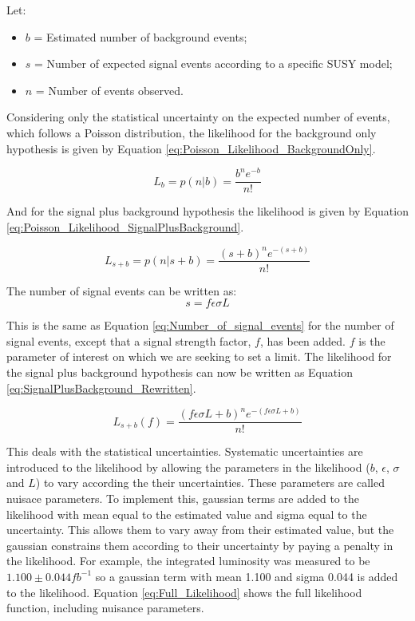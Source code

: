 Let: 
\begin{itemize}
\item $b$ = Estimated number of background events;
\item $s$ = Number of expected signal events according to a specific SUSY model;
\item $n$ = Number of events observed.
\end{itemize}

Considering only the statistical uncertainty on the expected number of events, 
which follows a Poisson distribution, the likelihood for the background only 
hypothesis is given by Equation \ref{eq:Poisson_Likelihood_BackgroundOnly}.

\begin{equation}
L_{b} = p(n|b) = \frac{b^{n}e^{-b}}{n!} 
\label{eq:Poisson_Likelihood_BackgroundOnly}
\end{equation}

And for the signal plus background hypothesis the likelihood is given by Equation
\ref{eq:Poisson_Likelihood_SignalPlusBackground}.

\begin{equation}
L_{s+b} = p(n|s+b) = \frac{(s+b)^{n}e^{-(s+b)}}{n!} 
\label{eq:Poisson_Likelihood_SignalPlusBackground}
\end{equation}

The number of signal events can be written as:
\begin{equation}
s = f\epsilon\sigma L
\label{eq:fsig}
\end{equation}

This is the same as Equation \ref{eq:Number_of_signal_events} for the number of 
signal events, except that a signal strength factor, $f$, has been added. $f$ is 
the parameter of interest on which we are seeking to set a limit. The likelihood 
for the signal plus background hypothesis can now be written as Equation 
\ref{eq:SignalPlusBackground_Rewritten}. 

\begin{equation}
L_{s+b}(f) = \frac{(f\epsilon \sigma L + b)^{n} e^{-(f\epsilon \sigma L + b)}}{n!} 
\label{eq:SignalPlusBackground_Rewritten}
\end{equation}

This deals with the statistical uncertainties. Systematic uncertainties are 
introduced to the likelihood by allowing the parameters in the likelihood ($b$,
$\epsilon$, $\sigma$ and $L$) to vary according the their uncertainties. These
parameters are called nuisace parameters. To implement this, gaussian terms are 
added to the likelihood with mean equal to the estimated value and sigma equal 
to the uncertainty. This allows them to vary away from their estimated value, 
but the gaussian constrains them according to their uncertainty by paying a 
penalty in the likelihood. For example, the integrated luminosity was measured 
to be $1.100\pm0.044 \unit{fb^{-1}}$ so a gaussian term with mean 1.100 and 
sigma 0.044 is added to the likelihood. Equation \ref{eq:Full_Likelihood} shows 
the full likelihood function, including nuisance parameters. 

